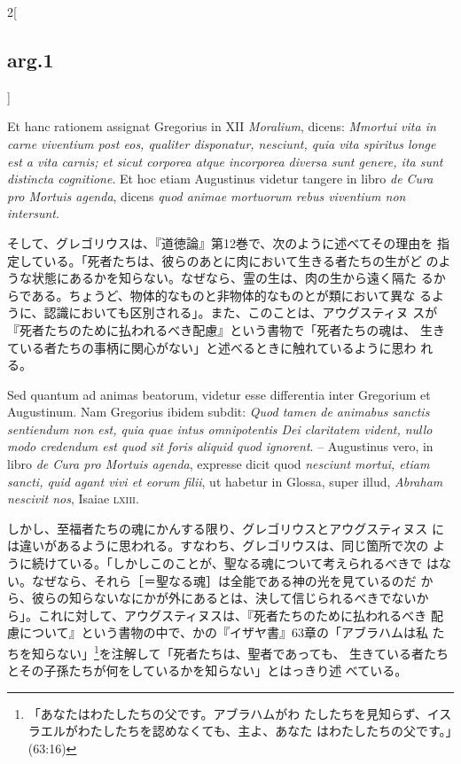 \documentclass[paper=a4paper,fontsize=10pt,jafontsize=9pt,titlepage]{jlreq}
\begin{document}
\begin{paracol}{2}[\subsection{arg.1}]
\switchcolumn*

Et hanc rationem assignat Gregorius in XII {\itshape Moralium}, dicens:
{\itshape Mmortui vita in carne viventium post eos, qualiter disponatur,
nesciunt, quia vita spiritus longe est a vita carnis; et sicut
corporea atque incorporea diversa sunt genere, ita sunt distincta
cognitione}. Et hoc etiam Augustinus videtur tangere in libro {\itshape de
Cura pro Mortuis agenda}, dicens {\itshape quod animae mortuorum rebus
viventium non intersunt}.

\switchcolumn

そして、グレゴリウスは、『道徳論』第12巻で、次のように述べてその理由を
指定している。「死者たちは、彼らのあとに肉において生きる者たちの生がど
のような状態にあるかを知らない。なぜなら、霊の生は、肉の生から遠く隔た
るからである。ちょうど、物体的なものと非物体的なものとが類において異な
るように、認識においても区別される」。また、このことは、アウグスティヌ
スが『死者たちのために払われるべき配慮』という書物で「死者たちの魂は、
生きている者たちの事柄に関心がない」と述べるときに触れているように思わ
れる。

\switchcolumn*

Sed quantum ad animas beatorum, videtur esse differentia inter
Gregorium et Augustinum. Nam Gregorius ibidem subdit: {\itshape Quod tamen
de animabus sanctis sentiendum non est, quia quae intus omnipotentis
Dei claritatem vident, nullo modo credendum est quod sit foris aliquid
quod ignorent}. -- Augustinus vero, in libro {\itshape de Cura pro Mortuis
agenda}, expresse dicit quod {\itshape nesciunt mortui, etiam sancti, quid
agant vivi et eorum filii}, ut habetur in Glossa, super illud, {\itshape
Abraham nescivit nos}, Isaiae {\scshape lxiii}.

\switchcolumn

しかし、至福者たちの魂にかんする限り、グレゴリウスとアウグスティヌス
には違いがあるように思われる。すなわち、グレゴリウスは、同じ箇所で次の
ように続けている。「しかしこのことが、聖なる魂について考えられるべきで
はない。なぜなら、それら［＝聖なる魂］は全能である神の光を見ているのだ
から、彼らの知らないなにかが外にあるとは、決して信じられるべきでないか
ら」。これに対して、アウグスティヌスは、『死者たちのために払われるべき
配慮について』という書物の中で、かの『イザヤ書』63章の「アブラハムは私
たちを知らない」\footnote{「あなたはわたしたちの父です。アブラハムがわ
たしたちを見知らず、イスラエルがわたしたちを認めなくても、主よ、あなた
はわたしたちの父です。」(63:16)}を注解して「死者たちは、聖者であっても、
生きている者たちとその子孫たちが何をしているかを知らない」とはっきり述
べている。


\end{paracol}
\end{document}
